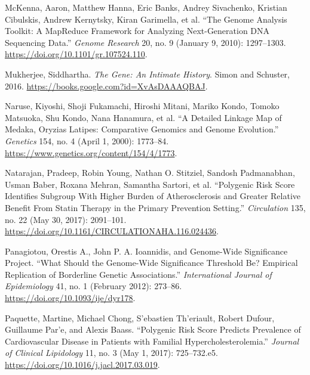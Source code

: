 \documentclass[
  9pt,
]{book}
\newlength{\cslhangindent}
\newlength{\cslentryspacingunit} %
\newenvironment{CSLReferences}[2] %
 {%
  \setlength{\parindent}{0pt}
  \ifodd #1
  \let\oldpar\par
  \def\par{\hangindent=\cslhangindent\oldpar}
  \fi
  \setlength{\parskip}{#2\cslentryspacingunit}
 }%
 {}
\begin{document}
\begin{CSLReferences}{1}{0}
\leavevmode{}%
McKenna, Aaron, Matthew Hanna, Eric Banks, Andrey Sivachenko, Kristian Cibulskis, Andrew Kernytsky, Kiran Garimella, et al. {``The {Genome Analysis Toolkit}: {A MapReduce} Framework for Analyzing Next-Generation {DNA} Sequencing Data.''} \emph{Genome Research} 20, no. 9 (January 9, 2010): 1297--1303. \url{https://doi.org/10.1101/gr.107524.110}.

\leavevmode{}%
Mukherjee, Siddhartha. \emph{The {Gene}: {An Intimate History}}. {Simon and Schuster}, 2016. \url{https://books.google.com?id=XvAsDAAAQBAJ}.

\leavevmode{}%
Naruse, Kiyoshi, Shoji Fukamachi, Hiroshi Mitani, Mariko Kondo, Tomoko Matsuoka, Shu Kondo, Nana Hanamura, et al. {``A {Detailed Linkage Map} of {Medaka}, {Oryzias} Latipes: {Comparative Genomics} and {Genome Evolution}.''} \emph{Genetics} 154, no. 4 (April 1, 2000): 1773--84. \url{https://www.genetics.org/content/154/4/1773}.

\leavevmode{}%
Natarajan, Pradeep, Robin Young, Nathan O. Stitziel, Sandosh Padmanabhan, Usman Baber, Roxana Mehran, Samantha Sartori, et al. {``Polygenic {Risk Score Identifies Subgroup With Higher Burden} of {Atherosclerosis} and {Greater Relative Benefit From Statin Therapy} in the {Primary Prevention Setting}.''} \emph{Circulation} 135, no. 22 (May 30, 2017): 2091--101. \url{https://doi.org/10.1161/CIRCULATIONAHA.116.024436}.

\leavevmode{}%
Panagiotou, Orestis A., John P. A. Ioannidis, and Genome-Wide Significance Project. {``What Should the Genome-Wide Significance Threshold Be? {Empirical} Replication of Borderline Genetic Associations.''} \emph{International Journal of Epidemiology} 41, no. 1 (February 2012): 273--86. \url{https://doi.org/10.1093/ije/dyr178}.

\leavevmode{}%
Paquette, Martine, Michael Chong, S'ebastien Th'eriault, Robert Dufour, Guillaume Par'e, and Alexis Baass. {``Polygenic Risk Score Predicts Prevalence of Cardiovascular Disease in Patients with Familial Hypercholesterolemia.''} \emph{Journal of Clinical Lipidology} 11, no. 3 (May 1, 2017): 725--732.e5. \url{https://doi.org/10.1016/j.jacl.2017.03.019}.


\end{CSLReferences}
\end{document}
